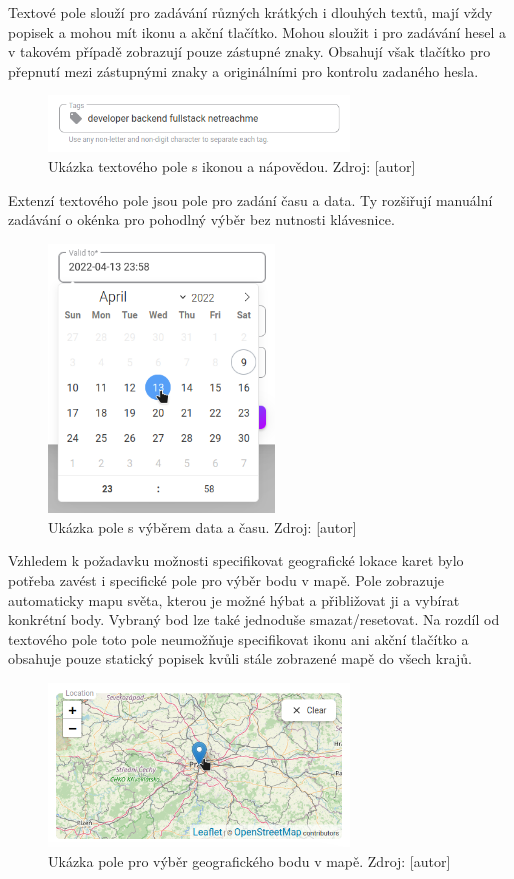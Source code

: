 			Textové pole slouží pro zadávání různých krátkých i dlouhých textů, mají vždy popisek a mohou mít ikonu a
			akční tlačítko.
			Mohou sloužit i pro zadávání hesel a v takovém případě zobrazují pouze zástupné znaky.
			Obsahují však tlačítko pro přepnutí mezi zástupnými znaky a originálními pro kontrolu zadaného hesla.

			\begin{figure}[H]
				\centering
				\includegraphics[width=8cm]{obrazky/textove_pole}\hfill
				\caption{Ukázka textového pole s ikonou a nápovědou. Zdroj: [autor]}
			\end{figure}

			Extenzí textového pole jsou pole pro zadání času a data.
			Ty rozšiřují manuální zadávání o okénka pro pohodlný výběr bez nutnosti klávesnice.

			\begin{figure}[H]
				\centering
				\includegraphics[width=6cm]{obrazky/datumove_pole}\hfill
				\caption{Ukázka pole s výběrem data a času. Zdroj: [autor]}
			\end{figure}

			Vzhledem k požadavku možnosti specifikovat geografické lokace karet bylo potřeba zavést i specifické pole
			pro výběr bodu v mapě.
			Pole zobrazuje automaticky mapu světa, kterou je možné hýbat a přibližovat ji a vybírat konkrétní body.
			Vybraný bod lze také jednoduše smazat/resetovat.
			Na rozdíl od textového pole toto pole neumožňuje specifikovat ikonu ani akční tlačítko a obsahuje pouze
			statický popisek kvůli stále zobrazené mapě do všech krajů.

			\begin{figure}[H]
				\centering
				\includegraphics[width=8cm]{obrazky/pole_lokace}\hfill
				\caption{Ukázka pole pro výběr geografického bodu v mapě. Zdroj: [autor]}
			\end{figure}

